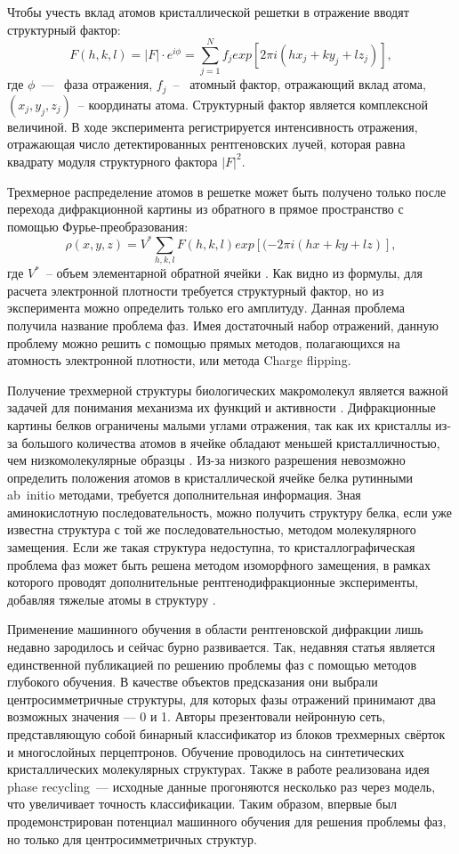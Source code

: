 \documentclass[a4paper,12pt]{article}
\begin{document}
{Чтобы учесть вклад атомов кристаллической решетки в отражение вводят структурный фактор: \[F(h, k, l) = |F |\cdot e^{i\phi} = \sum_{j=1}^N f_j exp[2\pi i(hx_j + ky_j + lz_j)], \] где $\phi$~---~ фаза отражения, $f_j$~--~ атомный фактор, отражающий вклад атома, $(x_j, y_j, z_j)$~-- координаты атома. Структурный фактор является комплексной величиной. В ходе эксперимента регистрируется интенсивность отражения, отражающая число детектированных рентгеновских лучей, которая равна квадрату модуля структурного фактора $|F|^2$.

Трехмерное распределение атомов в решетке может быть получено только после перехода дифракционной картины из обратного в прямое пространство с помощью Фурье-преобразования: \[\rho(x, y, z) = V^*\sum_{h,k,l} F(h,k,l) exp[(-2\pi i (hx+ky+lz)],\] где $V^*$~-- объем элементарной обратной ячейки \cite{giro}. Как видно из формулы, для расчета электронной плотности требуется структурный фактор, но из эксперимента можно определить только его амплитуду. Данная проблема получила название проблема фаз. Имея достаточный набор отражений, данную проблему можно решить с помощью прямых методов, полагающихся на атомность электронной плотности, или метода Charge flipping.

Получение трехмерной структуры биологических макромолекул является важной задачей для понимания механизма их функций и активности \cite{xrdsap}. Дифракционные картины белков ограничены малыми углами отражения, так как их кристаллы из-за большого количества атомов в ячейке обладают меньшей кристалличностью, чем низкомолекулярные образцы \cite{giro}. Из-за низкого разрешения невозможно определить положения атомов в кристаллической ячейке белка рутинными ab~initio методами, требуется дополнительная информация. Зная аминокислотную последовательность, можно получить структуру белка, если уже известна структура с той же последовательностью, методом молекулярного замещения. Если же такая структура недоступна, то кристаллографическая проблема фаз может быть решена методом изоморфного замещения, в рамках которого проводят дополнительные рентгенодифракционные эксперименты, добавляя тяжелые атомы в структуру \cite{acta}.

Применение машинного обучения в области рентгеновской дифракции лишь недавно зародилось и сейчас бурно развивается. Так, недавняя статья \cite{science} является единственной публикацией по решению проблемы фаз с помощью методов глубокого обучения. В качестве объектов предсказания они выбрали центросимметричные структуры, для которых фазы отражений принимают два возможных значения --- 0 и 1. Авторы презентовали нейронную сеть, представляющую собой бинарный классификатор из блоков трехмерных свёрток и многослойных перцептронов. Обучение проводилось на синтетических кристаллических молекулярных структурах. Также в работе реализована идея phase recycling~--- исходные данные прогоняются несколько раз через модель, что увеличивает точность классификации. Таким образом, впервые был продемонстрирован потенциал машинного обучения для решения проблемы фаз, но только для центросимметричных структур.

}
\end{document}
